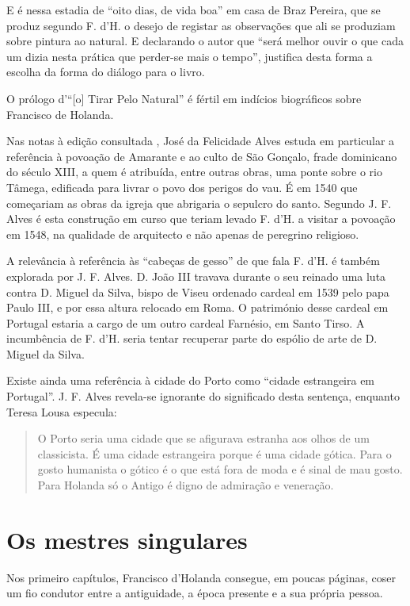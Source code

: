 \documentclass{article}
\begin{document}
E é nessa estadia de ``oito dias, de vida boa'' em casa de Braz
Pereira, que se produz segundo F. d'H. o desejo de registar as
observações que ali se produziam sobre pintura ao natural. E
declarando o autor que ``será melhor ouvir o que cada um dizia nesta
prática que perder-se mais o tempo''\cite[p12]{holanda}, justifica
desta forma a escolha da forma do diálogo para o livro.

O prólogo d'``[o] Tirar Pelo Natural'' é fértil em indícios
biográficos sobre Francisco de Holanda.

Nas notas à edição consultada \cite{holanda}, José da Felicidade Alves
estuda em particular a referência à povoação de Amarante e ao culto de
São Gonçalo, frade dominicano do século XIII, a quem é atribuída,
entre outras obras, uma ponte sobre o rio Tâmega, edificada para
livrar o povo dos perigos do vau. É em 1540 que começariam as obras da
igreja que abrigaria o sepulcro do santo. Segundo J. F. Alves é esta
construção em curso que teriam levado F. d'H. a visitar a povoação em
1548, na qualidade de arquitecto e não apenas de peregrino religioso.

A relevância à referência às ``cabeças de gesso'' de que fala
F. d'H. é também explorada por J. F. Alves. D. João III travava
durante o seu reinado uma luta contra D. Miguel da Silva, bispo de
Viseu ordenado cardeal em 1539 pelo papa Paulo III, e por essa altura
relocado em Roma. O património desse cardeal em Portugal estaria a
cargo de um outro cardeal Farnésio, em Santo Tirso. A incumbência de
F. d'H. seria tentar recuperar parte do espólio de arte de D. Miguel
da Silva.

Existe ainda uma referência à cidade do Porto como ``cidade
estrangeira em Portugal''. J. F. Alves revela-se ignorante do
significado desta sentença, enquanto Teresa Lousa\cite{teresa-desenho}
especula:

\begin{quote}
 O Porto seria uma cidade que se afigurava estranha aos olhos de um
 classicista. É uma cidade estrangeira porque é uma cidade
 gótica. Para o gosto humanista o gótico é o que está fora de moda e é
 sinal de mau gosto.  Para Holanda só o Antigo é digno de admiração e
 veneração.
\end{quote}

\section{Os mestres singulares}

Nos primeiro capítulos, Francisco d'Holanda consegue, em poucas
páginas, coser um fio condutor entre a antiguidade, a época presente e
a sua própria pessoa.
\end{document}
